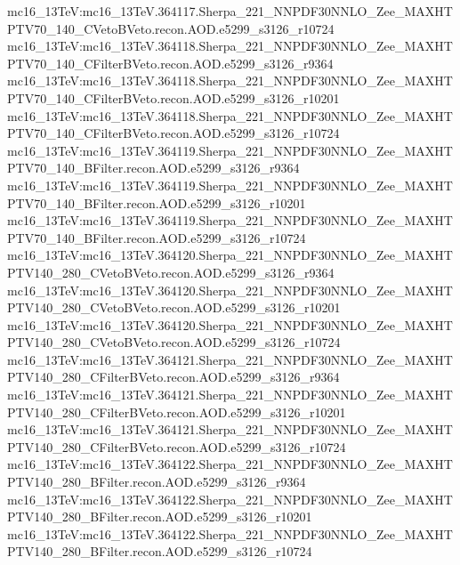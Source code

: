 { mc16\_13TeV:mc16\_13TeV.364117.Sherpa\_221\_NNPDF30NNLO\_Zee\_MAXHTPTV70\_140\_CVetoBVeto.recon.AOD.e5299\_s3126\_r10724 \newline  
 mc16\_13TeV:mc16\_13TeV.364118.Sherpa\_221\_NNPDF30NNLO\_Zee\_MAXHTPTV70\_140\_CFilterBVeto.recon.AOD.e5299\_s3126\_r9364 \newline  
 mc16\_13TeV:mc16\_13TeV.364118.Sherpa\_221\_NNPDF30NNLO\_Zee\_MAXHTPTV70\_140\_CFilterBVeto.recon.AOD.e5299\_s3126\_r10201  \newline 
 mc16\_13TeV:mc16\_13TeV.364118.Sherpa\_221\_NNPDF30NNLO\_Zee\_MAXHTPTV70\_140\_CFilterBVeto.recon.AOD.e5299\_s3126\_r10724 \newline  
 mc16\_13TeV:mc16\_13TeV.364119.Sherpa\_221\_NNPDF30NNLO\_Zee\_MAXHTPTV70\_140\_BFilter.recon.AOD.e5299\_s3126\_r9364   \newline
 mc16\_13TeV:mc16\_13TeV.364119.Sherpa\_221\_NNPDF30NNLO\_Zee\_MAXHTPTV70\_140\_BFilter.recon.AOD.e5299\_s3126\_r10201 \newline  
 mc16\_13TeV:mc16\_13TeV.364119.Sherpa\_221\_NNPDF30NNLO\_Zee\_MAXHTPTV70\_140\_BFilter.recon.AOD.e5299\_s3126\_r10724   \newline
 mc16\_13TeV:mc16\_13TeV.364120.Sherpa\_221\_NNPDF30NNLO\_Zee\_MAXHTPTV140\_280\_CVetoBVeto.recon.AOD.e5299\_s3126\_r9364  \newline 
 mc16\_13TeV:mc16\_13TeV.364120.Sherpa\_221\_NNPDF30NNLO\_Zee\_MAXHTPTV140\_280\_CVetoBVeto.recon.AOD.e5299\_s3126\_r10201 \newline
 mc16\_13TeV:mc16\_13TeV.364120.Sherpa\_221\_NNPDF30NNLO\_Zee\_MAXHTPTV140\_280\_CVetoBVeto.recon.AOD.e5299\_s3126\_r10724 \newline  
 mc16\_13TeV:mc16\_13TeV.364121.Sherpa\_221\_NNPDF30NNLO\_Zee\_MAXHTPTV140\_280\_CFilterBVeto.recon.AOD.e5299\_s3126\_r9364  \newline  
 mc16\_13TeV:mc16\_13TeV.364121.Sherpa\_221\_NNPDF30NNLO\_Zee\_MAXHTPTV140\_280\_CFilterBVeto.recon.AOD.e5299\_s3126\_r10201 \newline   
 mc16\_13TeV:mc16\_13TeV.364121.Sherpa\_221\_NNPDF30NNLO\_Zee\_MAXHTPTV140\_280\_CFilterBVeto.recon.AOD.e5299\_s3126\_r10724 \newline  
 mc16\_13TeV:mc16\_13TeV.364122.Sherpa\_221\_NNPDF30NNLO\_Zee\_MAXHTPTV140\_280\_BFilter.recon.AOD.e5299\_s3126\_r9364   \newline  
 mc16\_13TeV:mc16\_13TeV.364122.Sherpa\_221\_NNPDF30NNLO\_Zee\_MAXHTPTV140\_280\_BFilter.recon.AOD.e5299\_s3126\_r10201  \newline   
 mc16\_13TeV:mc16\_13TeV.364122.Sherpa\_221\_NNPDF30NNLO\_Zee\_MAXHTPTV140\_280\_BFilter.recon.AOD.e5299\_s3126\_r10724   \newline  
}
